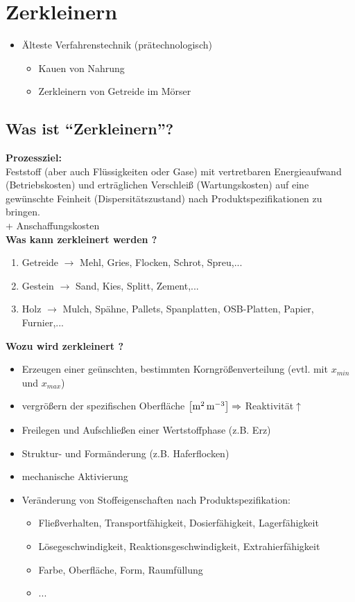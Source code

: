 \chapter{Zerkleinern}
\begin{itemize}
	\item Älteste Verfahrenstechnik (prätechnologisch)
	
	\begin{itemize}
		\item Kauen von Nahrung
		\item Zerkleinern von Getreide im Mörser
	\end{itemize}
\end{itemize}

\section{Was ist "`Zerkleinern"'?}

\textbf{Prozessziel:}\\
Feststoff (aber auch Flüssigkeiten oder Gase) mit vertretbaren Energieaufwand (Betriebskosten) und erträglichen Verschleiß (Wartungskosten) auf eine gewünschte Feinheit (Dispersitätszustand) nach Produktspezifikationen zu bringen.\\
+ Anschaffungskosten\\

\textbf{Was kann zerkleinert werden ?}
\begin{enumerate}
	\item Getreide $\rightarrow$ Mehl, Gries, Flocken, Schrot, Spreu,...
	\item Gestein $\rightarrow$ Sand, Kies, Splitt, Zement,...
	\item Holz $\rightarrow$ Mulch, Spähne, Pallets, Spanplatten, OSB-Platten, Papier, Furnier,...
\end{enumerate}

\textbf{Wozu wird zerkleinert ?}
\begin{itemize}
	\item Erzeugen einer geünschten, bestimmten Korngrößenverteilung (evtl. mit $x_{min}$ und $x_{max}$)
	\item vergrößern der spezifischen Oberfläche $\left[ \si{\raiseto{2}\meter\per\raiseto{3}\meter} \right] \Rightarrow$ Reaktivität$\uparrow$
	\item Freilegen und Aufschließen einer Wertstoffphase (z.B. Erz)
	\item Struktur- und Formänderung (z.B. Haferflocken)
	\item mechanische Aktivierung
	\item Veränderung von Stoffeigenschaften nach Produktspezifikation:
		\begin{itemize}
			\item Fließverhalten, Transportfähigkeit, Dosierfähigkeit, Lagerfähigkeit
			\item Lösegeschwindigkeit, Reaktionsgeschwindigkeit, Extrahierfähigkeit
			\item Farbe, Oberfläche, Form, Raumfüllung
			\item ...
		\end{itemize}
\end{itemize}

